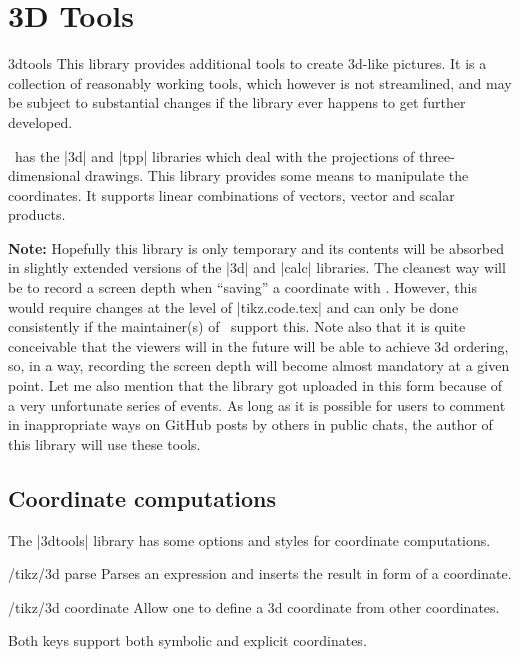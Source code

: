 \documentclass[a4paper]{ltxdoc}
\begin{document}
\section{3D Tools}
\begin{tikzlibrary}{3dtools}
    This library provides additional tools to create 3d-like pictures. It is a
	collection of reasonably working tools, which however is not streamlined,
	and may be subject to substantial changes if the library ever happens to get
	further developed.
\end{tikzlibrary}

\tikzname\ has the |3d| and |tpp| libraries which deal with the projections of
three-dimensional drawings. This library provides some means to manipulate
the coordinates. It supports linear combinations of vectors, vector and scalar
products.

\noindent\textbf{Note:} Hopefully this library is only temporary and its
contents will be absorbed in slightly extended versions of the |3d| and |calc|
libraries. The cleanest way will be to record a screen depth when ``saving'' a
coordinate with \tikzname. However, this would require changes at the level of
|tikz.code.tex| and can only be done consistently if the maintainer(s) of
\tikzname\ support this. Note also that it is quite conceivable that the viewers
will in the future will be able to achieve 3d ordering, so, in a way, recording
the screen depth will become almost mandatory at a given point. Let me also
mention that the library got uploaded in this form because of a very unfortunate
series of events. As long as it is possible for users to comment in
inappropriate ways on GitHub posts by others in public chats, the author of this
library will use these tools. 

\subsection{Coordinate computations}
\label{sec:3DCoordinateComputations}


The |3dtools| library has some options and styles for coordinate computations.
\begin{key}{/tikz/3d parse}
        Parses an expression and inserts the result in form of a coordinate.
\end{key}
\begin{key}{/tikz/3d coordinate}
        Allow one to define a 3d coordinate from other coordinates.
\end{key}
Both keys support both symbolic and explicit coordinates.
\end{document}
